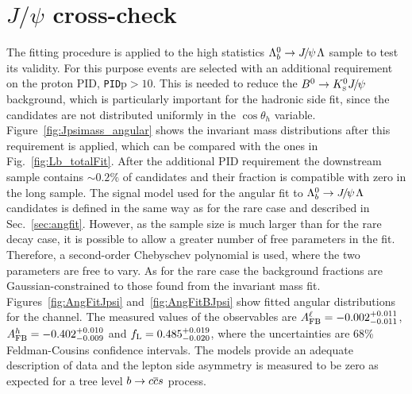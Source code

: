\section{$J/\psi$ cross-check}

The fitting procedure is applied to the high statistics $\Lb\to\jpsi\Lz$ sample to test its validity.
For this purpose events are selected with an additional requirement on the proton PID, \verb!PID!p$ > 10$.
This is needed to reduce the $\Bz\to\KS\jpsi$ background, which is particularly important for the hadronic side fit, 
since the \KS candidates are not distributed uniformly in the $\cos\theta_h$ variable.
Figure~\ref{fig:Jpsimass_angular} shows the invariant mass distributions after this requirement is applied, which 
can be compared with the ones in Fig.~\ref{fig:Lb_totalFit}. %
After the additional PID requirement the downstream sample contains $\sim0.2\%$ of \KS candidates and their fraction
is compatible with zero in the long sample.
The signal model used for the angular fit to $\Lb\to\jpsi\Lz$ candidates is defined in the same 
way as for the rare case and described in Sec.~\ref{sec:angfit}.
However, as the sample size is much larger than for the rare decay case, it is possible to allow a greater number 
of free parameters in the fit. Therefore, a second-order Chebyschev polynomial is used, where the two 
parameters are free to vary. As for the rare case the background fractions are Gaussian-constrained
to those found from the invariant mass fit. Figures~\ref{fig:AngFitJpsi} and~\ref{fig:AngFitBJpsi} show
fitted angular distributions for the \jpsi channel. The measured values of the observables
are \mbox{$A_{\rm FB}^\ell = -0.002^{+0.011}_{-0.011}$}, $A_{\rm FB}^h = -0.402^{+0.010}_{-0.009}$
and $f_{\rm L} = 0.485^{+0.019}_{-0.020}$, where the uncertainties are 68\% Feldman-Cousins 
confidence intervals. The models provide an adequate description of data and the lepton side asymmetry 
is measured to be zero as expected for a tree level $b\rightarrow c\overline {c}s$ process.
%
